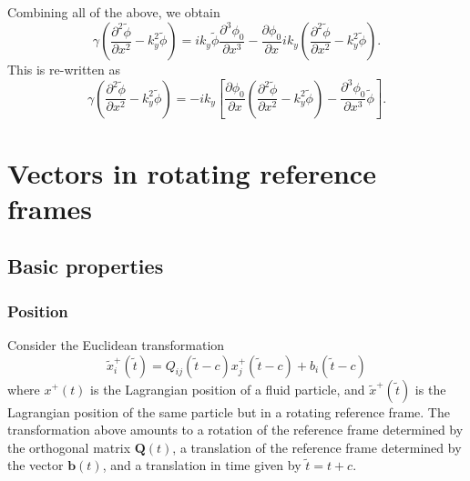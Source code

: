 \documentclass[oneside,a4paper,11pt]{report}
\begin{document}
Combining all of the above, we obtain
\begin{equation}
    \gamma \left ( \frac{\partial^2 \tilde{\phi}}{\partial x^2} - k_y^2 \tilde{\phi} \right ) = ik_y \tilde{\phi} \frac{\partial^3 \phi_0}{\partial x^3} - \frac{\partial \phi_0}{\partial x} i k_y \left ( \frac{\partial^2 \tilde{\phi}}{\partial x^2} - k_y^2 \tilde{\phi} \right ).
\end{equation}
This is re-written as 
\begin{equation}
    \gamma \left ( \frac{\partial^2 \tilde{\phi}}{\partial x^2} - k_y^2 \tilde{\phi} \right ) = -i k_y \left [ \frac{\partial \phi_0}{\partial x} \left ( \frac{\partial^2 \tilde{\phi}}{\partial x^2} - k_y^2 \tilde{\phi} \right ) - \frac{\partial^3 \phi_0}{\partial x^3} \tilde{\phi} \right ].
\end{equation}

\appendix

\chapter{Vectors in rotating reference frames}

\section{Basic properties}

\subsection{Position}
Consider the Euclidean transformation
\begin{equation}
\label{eq:x_rot}
\tilde{x}^+_i(\tilde{t}) = Q_{ij}(\tilde{t}-c) x^+_j(\tilde{t}-c) + b_i(\tilde{t}-c) 
\end{equation}
where $x^+(t)$ is the Lagrangian position of a fluid particle, and $\tilde{x}^+(\tilde{t})$ is the Lagrangian position of the same particle but in a rotating reference frame. The transformation above amounts to a rotation of the reference frame determined by the orthogonal matrix $\mathbf{Q}(t)$, a translation of the reference frame determined by the vector $\mathbf{b}(t)$, and a translation in time given by $\tilde{t} = t + c$. 
\end{document}
